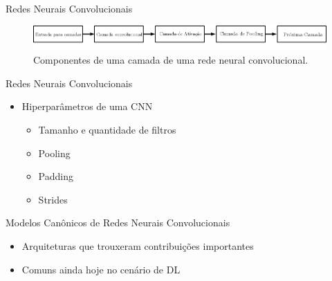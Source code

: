 \begin{frame}{Redes Neurais Convolucionais}
   \ \  \\[0.1cm]
   \begin{figure}
   	\centering
   	\caption{Componentes de uma camada de uma rede neural convolucional.}
   	\label{fig:cnn_camada}
   	\includegraphics[width=\textwidth]{img/cnn_camada_ipe.png}
   \end{figure}
\end{frame}

\begin{frame}{Redes Neurais Convolucionais}
   \ \  \\[0.1cm]
   \begin{itemize}
     \item Hiperparâmetros de uma CNN
     \begin{itemize}
       \item Tamanho e quantidade de filtros
       \item Pooling
       \item Padding
       \item Strides
     \end{itemize}
   \end{itemize}
\end{frame}

\begin{frame}{\LARGE{Modelos Canônicos de Redes Neurais Convolucionais}}
   \ \  \\[0.1cm]
   \begin{itemize}
     \item Arquiteturas que trouxeram contribuições importantes
     \item Comuns ainda hoje no cenário de DL
   \end{itemize}
\end{frame}

